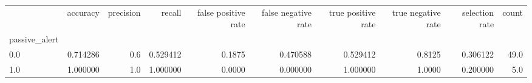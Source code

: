 \begin{tabular}{lrrrrrrrrr}
\toprule
{} &  accuracy &  precision &    recall &  false positive rate &  false negative rate &  true positive rate &  true negative rate &  selection rate &  count \\
passive\_alert &           &            &           &                      &                      &                     &                     &                 &        \\
\midrule
0.0           &  0.714286 &        0.6 &  0.529412 &               0.1875 &             0.470588 &            0.529412 &              0.8125 &        0.306122 &   49.0 \\
1.0           &  1.000000 &        1.0 &  1.000000 &               0.0000 &             0.000000 &            1.000000 &              1.0000 &        0.200000 &    5.0 \\
\bottomrule
\end{tabular}
